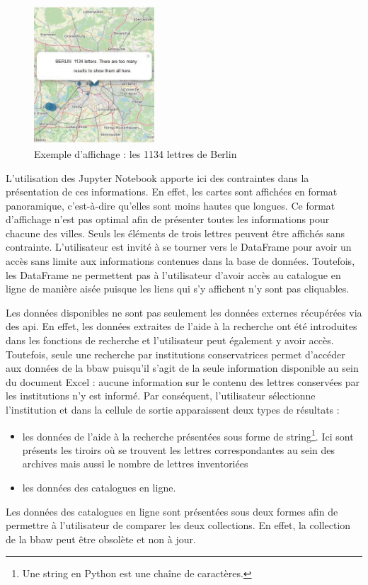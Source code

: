 \documentclass[a4paper, 12pt, twoside]{book}
\begin{document}
\begin{figure}
\label{wrapfig:carteBerlinInfo}
\includegraphics[width=0.40\textwidth]{img/mapviz_toutes_berlin_extrait.jpg}
\caption{Exemple d'affichage : les 1134 lettres de Berlin}
\vspace{-10pt}
\end{figure}
L'utilisation des Jupyter Notebook apporte ici des contraintes dans la présentation de ces informations. En effet, les cartes sont affichées en format panoramique, c'est-à-dire qu'elles sont moins hautes que longues. Ce format d'affichage n'est pas optimal afin de présenter toutes les informations pour chacune des villes. Seuls les éléments de trois lettres peuvent être affichés sans contrainte. L'utilisateur est invité à se tourner vers le DataFrame pour avoir un accès sans limite aux informations contenues dans la base de données. Toutefois, les DataFrame ne permettent pas à l'utilisateur d'avoir accès au catalogue en ligne de manière aisée puisque les liens qui s'y affichent n'y sont pas cliquables. 

Les données disponibles ne sont pas seulement les données externes récupérées via des \gls{api}. En effet, les données extraites de l'aide à la recherche ont été introduites dans les fonctions de recherche et l'utilisateur peut également y avoir accès. Toutefois, seule une recherche par institutions conservatrices permet d'accéder aux données de la \gls{bbaw} puisqu'il s'agit de la seule information disponible au sein du document Excel : aucune information sur le contenu des lettres conservées par les institutions n'y est informé. Par conséquent, l'utilisateur sélectionne l'institution et dans la cellule de sortie apparaissent deux types de résultats :
\begin{itemize}
    \item les données de l'aide à la recherche présentées sous forme de string\footnote{Une string en Python est une chaîne de caractères.}. Ici sont présents les tiroirs où se trouvent les lettres correspondantes au sein des archives mais aussi le nombre de lettres inventoriées
    \item les données des catalogues en ligne.
\end{itemize}
Les données des catalogues en ligne sont présentées sous deux formes afin de permettre à l'utilisateur de comparer les deux collections. En effet, la collection de la \gls{bbaw} peut être obsolète et non à jour. 
\end{document}
